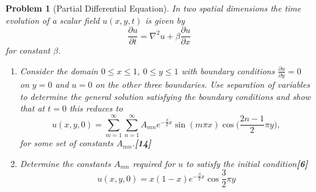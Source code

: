 \documentclass[a4paper]{article}
\theoremstyle{new}
\newtheorem{qns}{Problem}[section]
\begin{document}
\newpage
\begin{qns}[Partial Differential Equation]
In two spatial dimensions the time evolution of a scalar field $u(x, y, t)$ is given by
$$\frac{\partial u}{\partial t}=\nabla^2u+\beta\frac{\partial u}{\partial x}$$
for constant $\beta$.
\begin{enumerate}[label=(\alph*)]
    \item Consider the domain $0\leq x\leq 1$, $0\leq y\leq 1$ with boundary conditions $\frac{\partial u}{\partial y}=0$ on $y = 0$ and $u = 0$ on the other three boundaries. Use separation of variables to determine the general solution satisfying the boundary conditions and show that at $t = 0$ this reduces to
$$u(x,y,0)=\sum_{m=1}^\infty\sum_{n=1}^\infty A_{mn}e^{-\frac{\beta}{2}x}
\sin(m\pi x)\cos\bigg(\frac{2n-1}{2}\pi y\bigg),$$ 
for some set of constants $A_{mn}$.\hfill \textbf{[14]}
\item Determine the constants $A_{mn}$ required for $u$ to satisfy the initial condition\hfill \textbf{[6]}
$$u(x,y,0)=x(1-x)e^{-\frac{\beta}{2}x}\cos\frac{3}{2}\pi y$$
\end{enumerate}
\end{qns}
\end{document}

